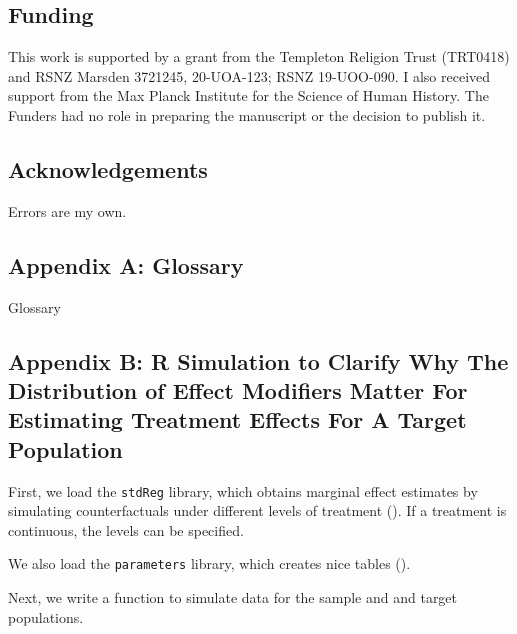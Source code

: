 \documentclass[
  single column]{article}
\begin{document}
\subsection{Funding}\label{funding}

This work is supported by a grant from the Templeton Religion Trust
(TRT0418) and RSNZ Marsden 3721245, 20-UOA-123; RSNZ 19-UOO-090. I also
received support from the Max Planck Institute for the Science of Human
History. The Funders had no role in preparing the manuscript or the
decision to publish it.

\subsection{Acknowledgements}\label{acknowledgements}

Errors are my own.

\subsection{Appendix A: Glossary}\label{appendix-a-glossary}

\begin{table}

\caption{\label{tbl-gloassary}Glossary}

\centering{

\glossaryTerms

}

\end{table}%

\subsection{Appendix B: R Simulation to Clarify Why The Distribution of
Effect Modifiers Matter For Estimating Treatment Effects For A Target
Population}\label{appendix-b-r-simulation-to-clarify-why-the-distribution-of-effect-modifiers-matter-for-estimating-treatment-effects-for-a-target-population}

First, we load the \texttt{stdReg} library, which obtains marginal
effect estimates by simulating counterfactuals under different levels of
treatment (). If a
treatment is continuous, the levels can be specified.

We also load the \texttt{parameters} library, which creates nice tables
().

Next, we write a function to simulate data for the sample and and target
populations.
\end{document}
